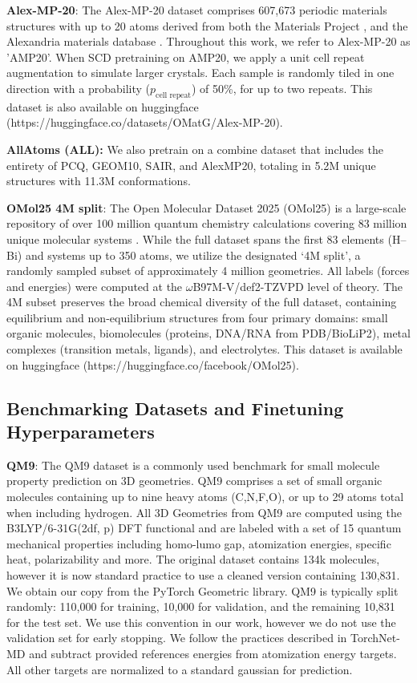 \textbf{Alex-MP-20}: The Alex-MP-20 dataset comprises 607,673 periodic materials structures with up to 20 atoms \cite{mattergen_zeni2023} derived from both the Materials Project \cite{MaterialsProject}, and the Alexandria materials database \cite{Alexandria_1, Alexandria_2}. Throughout this work, we refer to Alex-MP-20 as 'AMP20'. When SCD pretraining on AMP20, we apply a unit cell repeat augmentation to simulate larger crystals. Each sample is randomly tiled in one direction with a probability ($p_{\text{cell repeat}}$) of 50\%, for up to two repeats. This dataset is also available on huggingface (https://huggingface.co/datasets/OMatG/Alex-MP-20).

\textbf{AllAtoms (ALL):} We also pretrain on a combine dataset that includes the entirety of PCQ, GEOM10, SAIR, and AlexMP20, totaling in 5.2M unique structures with 11.3M conformations. 


\textbf{OMol25 4M split}: The Open Molecular Dataset 2025 (OMol25) is a large-scale repository of over 100 million quantum chemistry calculations covering 83 million unique molecular systems \cite{OMOL25_levine2025open}. While the full dataset spans the first 83 elements (H--Bi) and systems up to 350 atoms, we utilize the designated `4M split', a randomly sampled subset of approximately 4 million geometries. All labels (forces and energies) were computed at the $\omega$B97M-V/def2-TZVPD level of theory. The 4M subset preserves the broad chemical diversity of the full dataset, containing equilibrium and non-equilibrium structures from four primary domains: small organic molecules, biomolecules (proteins, DNA/RNA from PDB/BioLiP2), metal complexes (transition metals, ligands), and electrolytes. This dataset is available on huggingface (https://huggingface.co/facebook/OMol25).


\subsection{Benchmarking Datasets and Finetuning Hyperparameters}

\textbf{QM9}: The QM9 dataset is a commonly used benchmark for small molecule property prediction on 3D geometries\cite{QM9_Ramakrishnan2014}. QM9 comprises a set of small organic molecules containing up to nine heavy atoms (C,N,F,O), or up to 29 atoms total when including hydrogen. All 3D Geometries from QM9 are computed using the B3LYP/6-31G(2df, p) DFT functional and are labeled with a set of 15 quantum mechanical properties including homo-lumo gap, atomization energies, specific heat, polarizability and more. The original dataset contains 134k molecules, however it is now standard practice to use a cleaned version containing 130,831. We obtain our copy from the PyTorch Geometric library. QM9 is typically split randomly: 110,000 for training, 10,000 for validation, and the remaining 10,831 for the test set. We use this convention in our work, however we do not use the validation set for early stopping. We follow the practices described in TorchNet-MD\cite{TorchMD-Net_thölke2022} and subtract provided references energies from atomization energy targets. All other targets are normalized to a standard gaussian for prediction.


